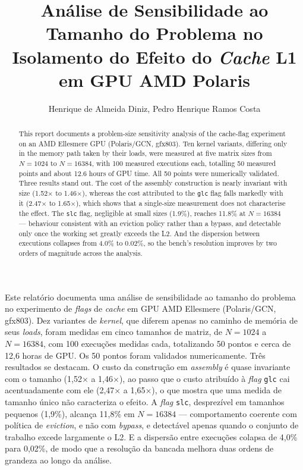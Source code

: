\documentclass[12pt]{article}
\title{Análise de Sensibilidade ao Tamanho do Problema no Isolamento
do Efeito do \textit{Cache} L1 em GPU AMD Polaris}
\author{Henrique de Almeida Diniz\inst{1}, Pedro Henrique Ramos Costa\inst{1}}
\begin{document}
\maketitle

\begin{abstract}
This report documents a problem-size sensitivity analysis of the cache-flag experiment on an
AMD Ellesmere GPU (Polaris/GCN, gfx803). Ten kernel variants, differing only in
the memory path taken by their loads, were measured at five matrix sizes from
$N=1024$ to $N=16384$, with 100 measured executions each, totalling 50 measured
points and about 12.6 hours of GPU time. All 50 points were numerically
validated. Three results stand out. The cost of the assembly construction is
nearly invariant with size (1.52$\times$ to 1.46$\times$), whereas the cost
attributed to the \texttt{glc} flag falls markedly with it (2.47$\times$ to
1.65$\times$), which shows that a single-size measurement does not characterise
the effect. The \texttt{slc} flag, negligible at small sizes (1.9\%), reaches
11.8\% at $N=16384$ --- behaviour consistent with an eviction policy rather than
a bypass, and detectable only once the working set greatly exceeds the L2. And
the dispersion between executions collapses from 4.0\% to 0.02\%, so the
bench's resolution improves by two orders of magnitude across the analysis.
\end{abstract}

\begin{resumo}
Este relatório documenta uma análise de sensibilidade ao tamanho do problema no experimento de
\textit{flags} de \textit{cache} em GPU AMD Ellesmere (Polaris/GCN, gfx803). Dez
variantes de \textit{kernel}, que diferem apenas no caminho de memória de seus
\textit{loads}, foram medidas em cinco tamanhos de matriz, de $N=1024$ a
$N=16384$, com 100 execuções medidas cada, totalizando 50 pontos e cerca de 12,6
horas de GPU. Os 50 pontos foram validados numericamente. Três resultados se
destacam. O custo da construção em \textit{assembly} é quase invariante com o
tamanho (1,52$\times$ a 1,46$\times$), ao passo que o custo atribuído à
\textit{flag} \texttt{glc} cai acentuadamente com ele (2,47$\times$ a
1,65$\times$), o que mostra que uma medida de tamanho único não caracteriza o
efeito. A \textit{flag} \texttt{slc}, desprezível em tamanhos pequenos (1,9\%),
alcança 11,8\% em $N=16384$ --- comportamento coerente com política de
\textit{eviction}, e não com \textit{bypass}, e detectável apenas quando o
conjunto de trabalho excede largamente o L2. E a dispersão entre execuções
colapsa de 4,0\% para 0,02\%, de modo que a resolução da bancada melhora duas
ordens de grandeza ao longo da análise.
\end{resumo}
\end{document}
